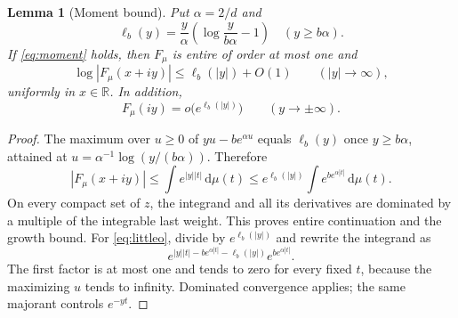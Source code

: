 \documentclass[11pt]{article}
\newtheorem{lemma}[theorem]{Lemma}
\theoremstyle{remark}\newtheorem{remark}[theorem]{Remark}
\newcommand{\R}{\mathbb R}\newcommand{\C}{\mathbb C}
\newcommand{\dd}{\,\mathrm d}
\begin{document}
\begin{lemma}[Moment bound]\label{lem:moment}
Put $\alpha=2/d$ and
\[
 \ell_b(y)=\frac y\alpha\left(\log\frac y{b\alpha}-1\right)\quad(y\ge b\alpha).
\]
If \eqref{eq:moment} holds, then $F_\mu$ is entire of order at most one and
\[
 \log|F_\mu(x+iy)|\le\ell_b(|y|)+O(1)\qquad (|y|\to\infty),
\]
uniformly in $x\in\R$. In addition,
\begin{equation}\label{eq:littleo}
 F_\mu(iy)=o\bigl(e^{\ell_b(|y|)}\bigr)\qquad(y\to\pm\infty).
\end{equation}
\end{lemma}
\begin{proof}
The maximum over $u\ge0$ of $yu-be^{\alpha u}$ equals $\ell_b(y)$ once $y\ge b\alpha$, attained at $u=\alpha^{-1}\log(y/(b\alpha))$. Therefore
\[
 |F_\mu(x+iy)|\le\int e^{|y||t|}\dd\mu(t)
 \le e^{\ell_b(|y|)}\int e^{be^{\alpha|t|}}\dd\mu(t).
\]
On every compact set of $z$, the integrand and all its derivatives are dominated by a multiple of the integrable last weight. This proves entire continuation and the growth bound. For \eqref{eq:littleo}, divide by $e^{\ell_b(|y|)}$ and rewrite the integrand as
\[
 e^{|y||t|-be^{\alpha|t|}-\ell_b(|y|)}e^{be^{\alpha|t|}}.
\]
The first factor is at most one and tends to zero for every fixed $t$, because the maximizing $u$ tends to infinity. Dominated convergence applies; the same majorant controls $e^{-yt}$.
\end{proof}
\end{document}
